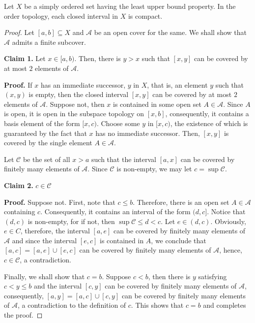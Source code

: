 \begin{theorem}
    Let $X$ be a simply ordered set having the least upper bound property. In the order topology, each closed interval in $X$ is compact.
\end{theorem}
\begin{proof}
Let $[a,b]\subseteq X$ and $\mathscr A$ be an open cover for the same. We shall show that $\mathscr A$ admits a finite subcover.

\textbf{Claim 1.} Let $x\in [a,b)$. Then, there is $y > x$ such that $[x,y]$ can be covered by at most $2$ elements of $\mathscr A$.

\textbf{Proof.} If $x$ has an immediate successor, $y$ in $X$, that is, an element $y$ such that $(x,y)$ is empty, then the closed interval $[x,y]$ can be covered by at most $2$ elements of $\mathscr A$. Suppose not, then $x$ is contained in some open set $A\in\mathscr A$. Since $A$ is open, it is open in the subspace topology on $[x,b]$, consequently, it contains a basis element of the form $[x,c)$. Choose some $y$ in $[x,c)$, the existence of which is guaranteed by the fact that $x$ has no immediate successor. Then, $[x,y]$ is covered by the single element $A\in\mathscr A$.

Let $\mathscr C$ be the set of all $x > a$ such that the interval $[a,x]$ can be covered by finitely many elements of $\mathscr A$. Since $\mathscr C$ is non-empty, we may let $c = \sup\mathscr C$.

\textbf{Claim 2.} $c\in\mathscr C$ 

\textbf{Proof.} Suppose not. First, note that $c\le b$. Therefore, there is an open set $A\in\mathscr A$ containing $c$. Consequently, it contains an interval of the form $(d,c]$. Notice that $(d,c)$ is non-empty, for if not, then $\sup\mathscr C\le d < c$. Let $e\in (d,c)$. Obviously, $e\in C$, therefore, the interval $[a,e]$ can be covered by finitely many elements of $\mathscr A$ and since the interval $[e,c]$ is contained in $A$, we conclude that $[a,c] = [a,e]\cup[e,c]$ can be covered by finitely many elements of $\mathscr A$, hence, $c\in\mathscr C$, a contradiction.

Finally, we shall show that $c = b$. Suppose $c < b$, then there is $y$ satisfying $c < y\le b$ and the interval $[c,y]$ can be covered by finitely many elements of $\mathscr A$, consequently, $[a,y] = [a,c]\cup[c,y]$ can be covered by finitely many elements of $\mathscr A$, a contradiction to the definition of $c$. This shows that $c = b$ and completes the proof.
\end{proof}

